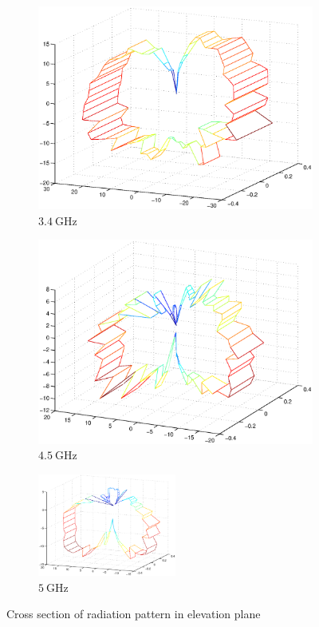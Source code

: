 \documentclass[a4paper]{article}        %
\begin{document}
		\begin{figure}[H]
			\begin{subfigure}{0.5\textwidth}
			\centering
				\includegraphics[width=\textwidth]{images/antenna/3D_radpat_3_4G}
				\caption{$\SI{3.4}{\giga\hertz}$}
			\end{subfigure}
			\begin{subfigure}{0.5\textwidth}
			\centering
				\includegraphics[width=\textwidth]{images/antenna/3D_radpat_4_5G}
				\caption{$\SI{4.5}{\giga\hertz}$}
			\end{subfigure}
			\begin{subfigure}{\textwidth}
			\centering
				\includegraphics[width=0.5\textwidth]{images/antenna/3D_radpat_5G}
				\caption{$\SI{5}{\giga\hertz}$}
			\end{subfigure}
		\caption{Cross section of radiation pattern in elevation plane}
		\label{fig:ant_radpat_elev}
		\end{figure}
\end{document}
